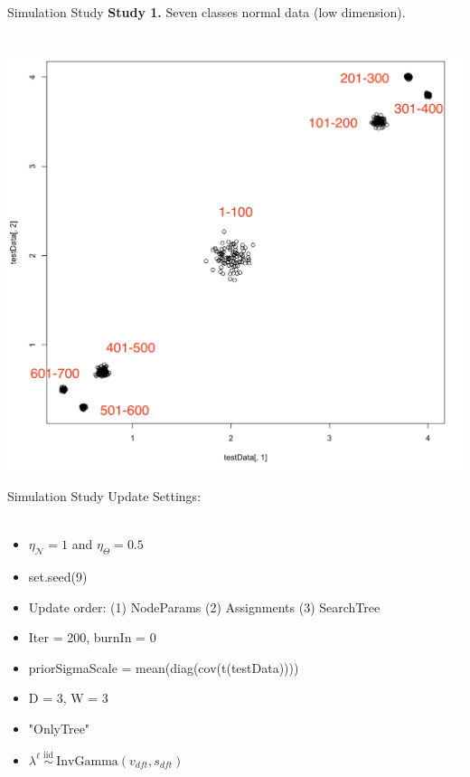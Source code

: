 \documentclass[10 pt]{beamer}
\begin{document}
\begin{frame}{Simulation Study}
\textbf{Study 1.} Seven classes normal data (low dimension).\\
~\\
\centerline{\includegraphics[scale=0.2]{figs/simulationData.png}}
\end{frame}

\begin{frame}{Simulation Study}
	Update Settings:\\
	~\\
	\begin{itemize}
		\item $\eta_{\mathcal{N}}=1$ and $\eta_{\Theta}=0.5$
		\item set.seed(9)
		\item Update order: (1) NodeParams (2) Assignments (3) SearchTree
		\item Iter = 200, burnIn = 0
		\item priorSigmaScale = mean(diag(cov(t(testData))))
		\item D = 3, W = 3
		\item "OnlyTree"
		\item $\lambda^\ell  \stackrel{\text { iid }}{\sim} \text{InvGamma}(v_{dft}, s_{dft})$
	\end{itemize}
\end{frame}
\end{document}
